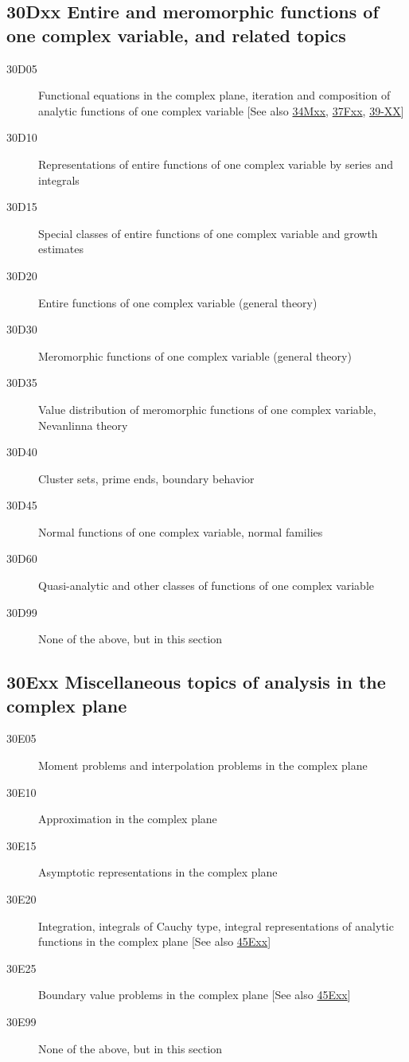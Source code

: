 \documentclass[letterpaper]{article}
\begin{document}
\subsection*{30Dxx  Entire and meromorphic functions of one complex variable, and related topics }\label{30Dxx}
\begin{description}  
\item [30D05]\label{30D05} Functional equations in the complex plane, iteration and composition of analytic functions of one complex variable [See also \hyperref[34Mxx]{34Mxx}, \hyperref[37Fxx]{37Fxx}, \hyperref[39-XX]{39-XX}]
\item [30D10]\label{30D10} Representations of entire functions of one complex variable by series and integrals
\item [30D15]\label{30D15} Special classes of entire functions of one complex variable and growth estimates
\item [30D20]\label{30D20} Entire functions of one complex variable (general theory)
\item [30D30]\label{30D30} Meromorphic functions of one complex variable (general theory)
\item [30D35]\label{30D35} Value distribution of meromorphic functions of one complex variable, Nevanlinna theory
\item [30D40]\label{30D40} Cluster sets, prime ends, boundary behavior
\item [30D45]\label{30D45} Normal functions of one complex variable, normal families
\item [30D60]\label{30D60} Quasi-analytic and other classes of functions of one complex variable
\item [30D99]\label{30D99} None of the above, but in this section
\end{description}
\subsection*{30Exx  Miscellaneous topics of analysis in the complex plane}\label{30Exx}
\begin{description}  
\item [30E05]\label{30E05} Moment problems and interpolation problems in the complex plane
\item [30E10]\label{30E10} Approximation in the complex plane
\item [30E15]\label{30E15} Asymptotic representations in the complex plane 
\item [30E20]\label{30E20} Integration, integrals of Cauchy type, integral representations of analytic functions in the complex plane [See also \hyperref[45Exx]{45Exx}]
\item [30E25]\label{30E25} Boundary value problems in the complex plane [See also \hyperref[45Exx]{45Exx}]
\item [30E99]\label{30E99} None of the above, but in this section
\end{description}
\end{document}
